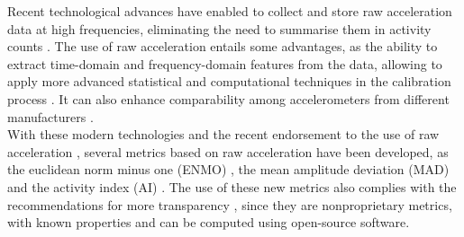 \documentclass[11pt]{article}
\begin{document}
Recent technological advances have enabled to collect and store raw acceleration data at high frequencies, eliminating the need to summarise them in activity counts \cite{Bakrania_2016}. The use of raw acceleration entails some advantages, as the ability to extract time-domain and frequency-domain features from the data, allowing to apply more advanced statistical and computational techniques in the calibration process \cite{John_2013}. It can also enhance comparability among accelerometers from different manufacturers \cite{Mendes_2018, Rowlands_2016}. \\

With these modern technologies and the recent endorsement to the use of raw acceleration \cite{Freedson_2012}, several metrics based on raw acceleration have been developed, as the euclidean norm minus one (ENMO) \cite{vanHees_2013}, the mean amplitude deviation (MAD) \cite{Vaha-Ypya_2015} and the activity index (AI) \cite{Bai_2016}. The use of these new metrics also complies with the recommendations for more transparency \cite{Intille_2012}, since they are nonproprietary metrics, with known properties and can be computed using open-source software.



\end{document}
